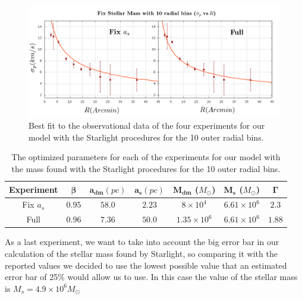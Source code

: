 \begin{figure}[H]
\centering
\includegraphics[width=15cm]{images/Starlight_1.png}
\caption[Best fit of our model with the mass found with the Starlight procedures for the 10 outer radial bins]{Best fit to the observational data of the four experiments for our model with the Starlight procedures for the 10 outer radial bins.}
\end{figure}

\begin{table}[H]
\begin{center}
\begin{tabular}{| c| c| c| c| c| c| c|}
    \hline
    \textbf{Experiment} & $\mathbf{\beta}$ & $\mathbf{a_{dm}} (pc)$ & $\mathbf{a_{s}} (pc)$ & $\mathbf{M_{dm}}$ ($M_{\odot}$) & $\mathbf{M_{s}}$ ($M_{\odot}$) & $\mathbf{\Gamma}$\\ \hline
	Fix $a_s$ &	$0.95$ &	$58.0$ &	$2.23$ &	$8 \times 10^{4}$ &	$6.61 \times 10 ^{6}$ &	$2.3$\\ \hline
	Full &	$0.96$ &	$7.36$ &	$50.0$ &	$1.35 \times 10^{6}$ &	$6.61 \times 10^{6}$ &	$1.88$\\ \hline
  \end{tabular} 
\caption[Optimized parameters for our model with the mass found with the Starlight procedures for the 10 outer radial bins.]{The optimized parameters for each of the experiments for our model with the mass found with the Starlight procedures for the 10 outer radial bins.}
\end{center}
\end{table}

As a last experiment, we want to take into account the big error bar in our calculation of the stellar mass found by Starlight, so comparing it with the reported values we decided to use the lowest possible value that an estimated error bar of 25\% would allow us to use. In this case the value of the stellar mass is $M_{s}=4.9 \times 10^{6} M_{\odot}$

